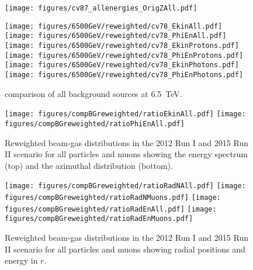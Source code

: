 \begin{figure}
\begin{center}
  \texttt{[image: figures/cv87\_allenergies\_OrigZAll.pdf]}
\end{center}
\vspace{-0.6cm}
 \caption{
  \label{fig:OrigZMuonAllEn2}} 
\end{figure}



\begin{figure}
\begin{center}
  \texttt{[image: figures/6500GeV/reweighted/cv78\_EkinAll.pdf]}
  \texttt{[image: figures/6500GeV/reweighted/cv78\_PhiEnAll.pdf]}
  \texttt{[image: figures/6500GeV/reweighted/cv78\_EkinProtons.pdf]}
  \texttt{[image: figures/6500GeV/reweighted/cv78\_PhiEnProtons.pdf]}
 \texttt{[image: figures/6500GeV/reweighted/cv78\_EkinPhotons.pdf]}
 \texttt{[image: figures/6500GeV/reweighted/cv78\_PhiEnPhotons.pdf]}
\end{center}
\vspace{-0.6cm}
 \caption{comparison of all background sources at 6.5~TeV.
  \label{compAllBKG_6.52}}
\end{figure}

\begin{figure}%
\centering
\texttt{[image: figures/compBGreweighted/ratioEkinAll.pdf]}
\texttt{[image: figures/compBGreweighted/ratioPhiEnAll.pdf]}
\caption{Reweighted beam-gas distributions in the 2012 Run I and 2015 Run II scenario for all particles and muons showing the energy spectrum (top) and the azimuthal distribution (bottom).
  \label{fig:compBGreweighted12}}
\end{figure}




\begin{figure}%
\centering
\texttt{[image: figures/compBGreweighted/ratioRadNAll.pdf]}
\texttt{[image: figures/compBGreweighted/ratioRadNMuons.pdf]}
\texttt{[image: figures/compBGreweighted/ratioRadEnAll.pdf]}
\texttt{[image: figures/compBGreweighted/ratioRadEnMuons.pdf]}
\caption{Reweighted beam-gas distributions in the 2012 Run I and 2015 Run II scenario for all particles and muons showing radial positions and energy in $r$.
  \label{fig:compBGreweighted2}}
\end{figure}


